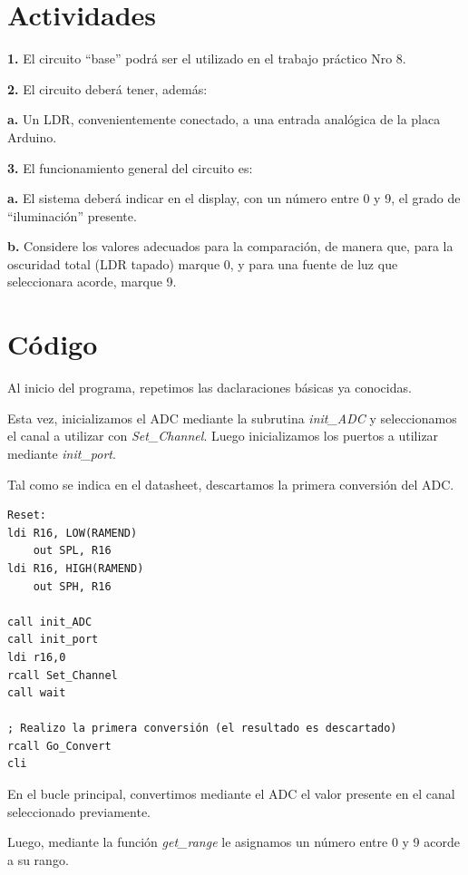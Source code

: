 \documentclass[a4paper, 12pt]{article}
\begin{document}
\newpage
{}

\section{Actividades}

\textbf{1.} El circuito “base” podrá ser el utilizado en el trabajo práctico Nro 8.

\textbf{2.} El circuito deberá tener, además:

\quad \textbf{a.} Un LDR, convenientemente conectado, a una entrada analógica de la placa Arduino.

\textbf{3.} El funcionamiento general del circuito es:

\quad \textbf{a.} El sistema deberá indicar en el display, con un número entre 0 y 9, el grado de “iluminación” presente.

\quad \textbf{b.} Considere los valores adecuados para la comparación, de manera que, para la oscuridad total (LDR tapado) marque 0, y para una fuente de luz que seleccionara acorde, marque 9.

\section{Código}

Al inicio del programa, repetimos las daclaraciones básicas ya conocidas.

Esta vez, inicializamos el ADC mediante la subrutina \textit{init\_ADC} y seleccionamos el canal a utilizar con \textit{Set\_Channel}. Luego inicializamos los puertos a utilizar mediante \textit{init\_port}.

Tal como se indica en el datasheet, descartamos la primera conversión del ADC.

\begin{lstlisting}
Reset:
ldi R16, LOW(RAMEND)
    out SPL, R16
ldi R16, HIGH(RAMEND)
    out SPH, R16

call init_ADC
call init_port
ldi r16,0
rcall Set_Channel
call wait

; Realizo la primera conversión (el resultado es descartado)
rcall Go_Convert
cli
\end{lstlisting}

En el bucle principal, convertimos mediante el ADC el valor presente en el canal seleccionado previamente.

Luego, mediante la función \textit{get\_range} le asignamos un número entre 0 y 9 acorde a su rango.
\end{document}
